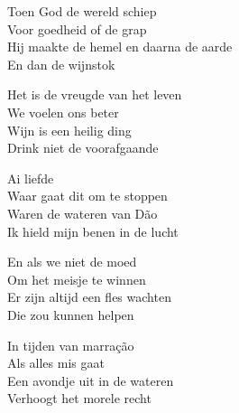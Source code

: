 \begin{translation}
Toen God de wereld schiep\\
Voor goedheid of de grap\\
Hij maakte de hemel en daarna de aarde\\
En dan de wijnstok\vspace{2.1ex}

Het is de vreugde van het leven\\
We voelen ons beter\\
Wijn is een heilig ding\\
Drink niet de voorafgaande\vspace{2.1ex}

Ai liefde\\
Waar gaat dit om te stoppen\\
Waren de wateren van Dão\\
Ik hield mijn benen in de lucht\vspace{2.1ex}

En als we niet de moed\\
Om het meisje te winnen\\
Er zijn altijd een fles wachten\\
Die zou kunnen helpen\vspace{2.1ex}

In tijden van marração\\
Als alles mis gaat\\
Een avondje uit in de wateren\\
Verhoogt het morele recht
\end{translation}
